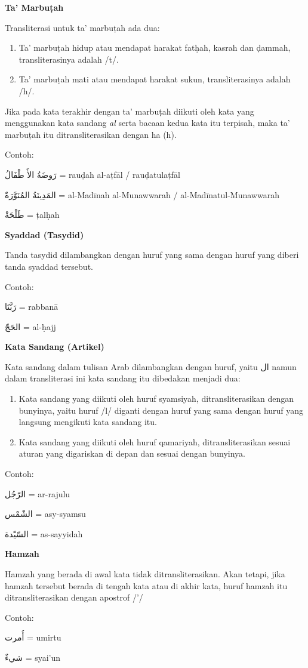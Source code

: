 \textbf{Ta' Marbu\d{t}ah}

Transliterasi untuk ta' marbu\d{t}ah ada dua:

\begin{enumerate}
\item Ta' marbu\d{t}ah hidup atau mendapat harakat fat\d{h}ah, kasrah dan
\d{d}ammah, transliterasinya adalah /t/.

\item Ta' marbu\d{t}ah mati atau mendapat harakat sukun, transliterasinya
adalah /h/.
\end{enumerate}


Jika pada kata terakhir dengan ta' marbu\d{t}ah diikuti oleh kata yang
menggunakan kata sandang \textit{al} serta bacaan kedua kata itu terpisah, maka
ta' marbu\d{t}ah itu ditransliterasikan dengan ha (h).

Contoh:

\textarabic{رَوضَةُ الأَ طْفَالُ} = rau\d{d}ah al-a\d{t}f\={a}l / rau\d{d}atula\d{t}f\={a}l

\textarabic{المَدِينَةُ المُنَوَّرَةٌ} = al-Mad\={i}nah al-Munawwarah / al-Mad\={i}natul-Munawwarah

\textarabic{طَلْحَةْ} = \d{t}al\d{h}ah

\textbf{Syaddad (Tasydid)}

Tanda tasydid dilambangkan dengan huruf yang sama dengan huruf
yang diberi tanda syaddad tersebut.

Contoh:

\textarabic{رَبَّنَا} = rabban\={a}

\textarabic{الحَجّ} = al-\d{h}ajj


\textbf{Kata Sandang (Artikel)}

Kata sandang dalam tulisan Arab dilambangkan dengan huruf, yaitu \textarabic{‫ال‬}
namun dalam transliterasi ini kata sandang itu dibedakan menjadi dua:

\begin{enumerate}
\item Kata sandang yang diikuti oleh huruf syamsiyah, ditransliterasikan dengan
bunyinya, yaitu huruf /l/ diganti dengan huruf yang sama dengan huruf yang
langsung mengikuti kata sandang itu.

\item Kata sandang yang diikuti oleh huruf qamariyah, ditransliterasikan sesuai
aturan yang digariskan di depan dan sesuai dengan bunyinya.
\end{enumerate}

Contoh:

\textarabic{الرّجُل} = ar-rajulu

\textarabic{الشّمْس} = asy-syamsu

\textarabic{السّيّدة} = as-sayyidah

\textbf{Hamzah}

Hamzah yang berada di awal kata tidak ditransliterasikan. Akan tetapi,
jika hamzah tersebut berada di tengah kata atau di akhir kata, huruf hamzah itu
ditransliterasikan dengan apostrof /'/

Contoh:

\textarabic{أُمرت} = umirtu

\textarabic{شيءٌ} = syai'un
